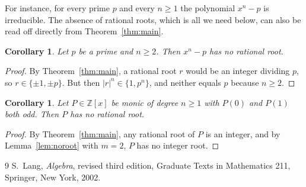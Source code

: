 \documentclass[11pt]{amsart}
\newtheorem{corollary}[theorem]{Corollary}
\theoremstyle{definition}
\newcommand{\Z}{\mathbb{Z}}
\begin{document}
For instance, for every prime $p$ and every $n\geq 1$ the polynomial
$x^n-p$ is irreducible. The absence of rational roots, which is all we need
below, can also be read off directly from Theorem~\ref{thm:main}.

\begin{corollary}\label{cor:xnp}
Let $p$ be a prime and $n\geq 2$. Then $x^n-p$ has no rational root.
\end{corollary}

\begin{proof}
By Theorem~\ref{thm:main}, a rational root $r$ would be an integer dividing
$p$, so $r\in\{\pm1,\pm p\}$. But then $|r|^n\in\{1,p^n\}$, and neither
equals $p$ because $n\geq 2$.
\end{proof}

\begin{corollary}\label{cor:parity}
Let $P\in\Z[x]$ be monic of degree $n\geq 1$ with $P(0)$ and $P(1)$ both
odd. Then $P$ has no rational root.
\end{corollary}

\begin{proof}
By Theorem~\ref{thm:main}, any rational root of $P$ is an integer, and by
Lemma~\ref{lem:noroot} with $m=2$, $P$ has no integer root.
\end{proof}

\begin{thebibliography}{9}
 S.~Lang, \emph{Algebra}, revised third edition, Graduate
Texts in Mathematics 211, Springer, New York, 2002.
\end{thebibliography}
\end{document}

